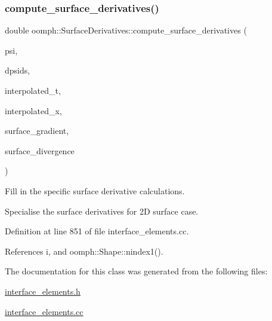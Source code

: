 \subsubsection{\texorpdfstring{compute\+\_\+surface\+\_\+derivatives()}{compute\_surface\_derivatives()}}
{\footnotesize\ttfamily double oomph\+::\+Surface\+Derivatives\+::compute\+\_\+surface\+\_\+derivatives (\begin{DoxyParamCaption}\item[{const \hyperlink{classoomph_1_1Shape}{Shape} \&}]{psi,  }\item[{const \hyperlink{classoomph_1_1DShape}{D\+Shape} \&}]{dpsids,  }\item[{const \hyperlink{classoomph_1_1DenseMatrix}{Dense\+Matrix}$<$ double $>$ \&}]{interpolated\+\_\+t,  }\item[{const \hyperlink{classoomph_1_1Vector}{Vector}$<$ double $>$ \&}]{interpolated\+\_\+x,  }\item[{\hyperlink{classoomph_1_1DShape}{D\+Shape} \&}]{surface\+\_\+gradient,  }\item[{\hyperlink{classoomph_1_1DShape}{D\+Shape} \&}]{surface\+\_\+divergence }\end{DoxyParamCaption})\hspace{0.3cm}{\ttfamily [protected]}}



Fill in the specific surface derivative calculations. 

Specialise the surface derivatives for 2D surface case. 

Definition at line 851 of file interface\+\_\+elements.\+cc.



References i, and oomph\+::\+Shape\+::nindex1().



The documentation for this class was generated from the following files\+:\begin{DoxyCompactItemize}
\item 
\hyperlink{interface__elements_8h}{interface\+\_\+elements.\+h}\item 
\hyperlink{interface__elements_8cc}{interface\+\_\+elements.\+cc}\end{DoxyCompactItemize}
